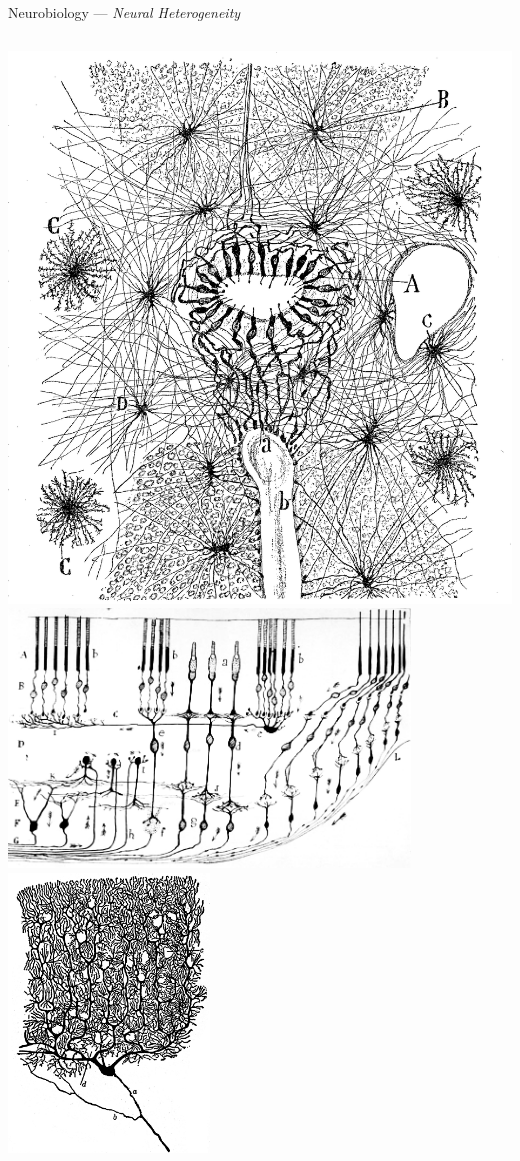 \documentclass[aspectratio=169]{beamer}
\renewcommand{\emph}[1]{{\color{violet}\textit{#1}}}
\begin{document}
\begin{frame}{Neurobiology --- \emph{Neural Heterogeneity}}
	\begin{columns}
			\centering
			\includegraphics[width=\textwidth]{media/cajal_neuroglia.png}
			\includegraphics[width=0.8\textwidth]{media/cajal_retina.png}\\
			\includegraphics[width=0.4\textwidth]{media/cajal_purkinje.png}\\

\end{columns}
\end{frame}
\end{document}
